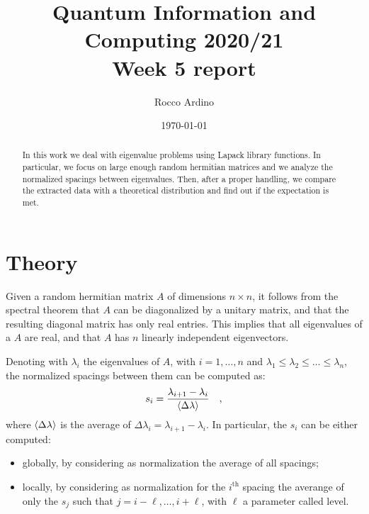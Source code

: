 \documentclass[pra, onecolumn, notitlepage, floats, 11pt]{revtex4-1}
\begin{document}
\title{Quantum Information and Computing 2020/21\\Week 5 report}

\author{Rocco Ardino}

\date{\today}





\begin{abstract}
    In this work we deal with eigenvalue problems using Lapack library functions. In particular, we focus on large enough random hermitian matrices and we analyze the normalized spacings between eigenvalues. Then, after a proper handling, we compare the extracted data with a theoretical distribution and find out if the expectation is met.
\end{abstract}

\maketitle




\section{Theory}
Given a random hermitian matrix \( A \) of dimensions \( n \times n \), it follows from the spectral theorem that \( A \) can be diagonalized by a unitary matrix, and that the resulting diagonal matrix has only real entries. This implies that all eigenvalues of a \( A \) are real, and that \( A \) has \( n \) linearly independent eigenvectors.

Denoting with \( \lambda_{i} \) the eigenvalues of \( A \), with \( i = 1, \dots, n \) and \( \lambda_{1} \le \lambda_{2} \le \dots \le \lambda_{n} \), the normalized spacings between them can be computed as:
\begin{equation}
    s_{i}
    =
    \frac{\lambda_{i+1} - \lambda_{i}}{\expval{\Delta \lambda}}
    \quad ,
    \label{eq:05_T_1}
\end{equation}
where \( \expval{\Delta \lambda} \) is the average of \( \Delta \lambda_{i} = \lambda_{i+1} - \lambda_{i} \). In particular, the \( s_{i} \) can be either computed:
\begin{itemize}
    \item globally, by considering as normalization the average of all spacings;
    \item locally, by considering as normalization for the \( i^{\text{th}} \) spacing the averange of only the \( s_{j} \) such that \( j = i-\ell, \dots, i+\ell \), with \( \ell \) a parameter called level.
\end{itemize}
\end{document}
